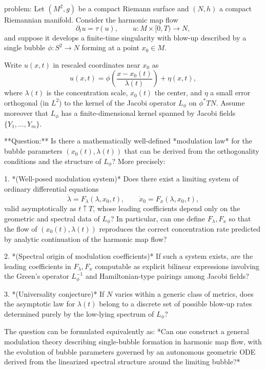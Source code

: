 problem:  
Let \( (M^2,g) \) be a compact Riemann surface and \( (N,h) \) a compact Riemannian manifold. Consider the harmonic map flow  
\[
\partial_t u = \tau(u), \qquad u: M\times[0,T)\to N,
\]
and suppose it develops a finite-time singularity with blow-up described by a single bubble \(\phi:S^2\to N\) forming at a point \(x_0\in M\).  

Write \(u(x,t)\) in rescaled coordinates near \(x_0\) as  
\[
u(x,t) = \phi\!\left(\frac{x-x_0(t)}{\lambda(t)}\right) + \eta(x,t),
\]
where \(\lambda(t)\) is the concentration scale, \(x_0(t)\) the center, and \(\eta\) a small error orthogonal (in \(L^2\)) to the kernel of the Jacobi operator \(L_\phi\) on \(\phi^*TN\).  
Assume moreover that \(L_\phi\) has a finite-dimensional kernel spanned by Jacobi fields \(\{Y_1,\ldots,Y_m\}\).

**Question:**  
Is there a mathematically well-defined *modulation law* for the bubble parameters \((x_0(t), \lambda(t))\) that can be derived from the orthogonality conditions and the structure of \(L_\phi\)? More precisely:

1. *(Well-posed modulation system)* Does there exist a limiting system of ordinary differential equations  
   \[
   \dot\lambda = F_\lambda(\lambda, x_0, t), \qquad \dot{x}_0 = F_x(\lambda, x_0, t),
   \]
   valid asymptotically as \(t\uparrow T\), whose leading coefficients depend only on the geometric and spectral data of \(L_\phi\)?  
   In particular, can one define \(F_\lambda, F_x\) so that the flow of \((x_0(t),\lambda(t))\) reproduces the correct concentration rate predicted by analytic continuation of the harmonic map flow?

2. *(Spectral origin of modulation coefficients)* If such a system exists, are the leading coefficients in \(F_\lambda,F_x\) computable as explicit bilinear expressions involving the Green’s operator \(L_\phi^{-1}\) and Hamiltonian-type pairings among Jacobi fields?  

3. *(Universality conjecture)* If \(N\) varies within a generic class of metrics, does the asymptotic law for \(\lambda(t)\) belong to a discrete set of possible blow-up rates determined purely by the low-lying spectrum of \(L_\phi\)?

The question can be formulated equivalently as: *Can one construct a general modulation theory describing single-bubble formation in harmonic map flow, with the evolution of bubble parameters governed by an autonomous geometric ODE derived from the linearized spectral structure around the limiting bubble?*

